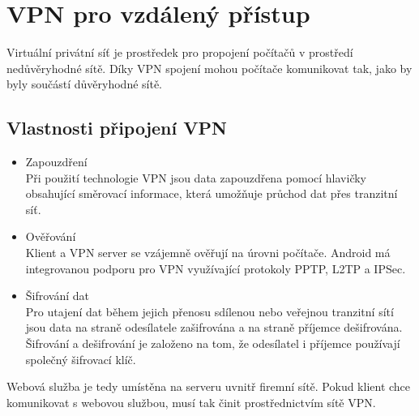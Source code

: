 \documentclass{diplomka}
\begin{document}
\section{VPN pro vzdálený přístup}
Virtuální privátní síť  je prostředek pro propojení počítačů v prostředí nedůvěryhodné sítě. Díky VPN spojení mohou počítače komunikovat tak, jako by byly součástí důvěryhodné sítě.

\subsection*{Vlastnosti připojení VPN}
\begin{itemize}[noitemsep,nolistsep]
\item Zapouzdření\\ Při použití technologie VPN jsou data zapouzdřena pomocí hlavičky obsahující směrovací informace, která umožňuje průchod dat přes tranzitní síť.
\item Ověřování\\
Klient a VPN server se vzájemně ověřují na úrovni počítače. Android má integrovanou podporu pro VPN využívající protokoly PPTP, L2TP a IPSec.
\item Šifrování dat\\
Pro utajení dat během jejich přenosu sdílenou nebo veřejnou tranzitní sítí jsou data na straně odesílatele zašifrována a na straně příjemce dešifrována. Šifrování a dešifrování je založeno na tom, že odesílatel i příjemce používají společný šifrovací klíč.
\end{itemize}

Webová služba je tedy umístěna na serveru uvnitř firemní sítě. Pokud klient chce komunikovat s webovou službou, musí tak činit 
prostřednictvím sítě VPN.
\end{document}
